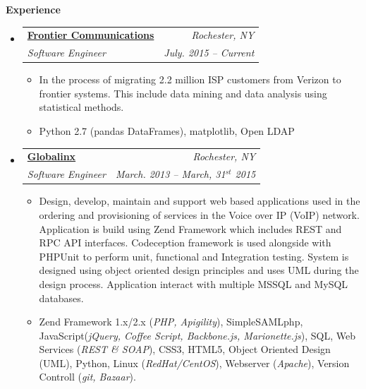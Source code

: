 \documentclass[11pt]{article}
\makeatletter
\newcommand{\resitem}[1]{\item #1 \vspace{-2pt}}
\newcommand{\resheading}[1]{{\large \colorbox{mygrey}{\begin{minipage}{\textwidth}{\textbf{#1 \vphantom{p\^{E}}}}\end{minipage}}}}
\newcommand{\ressubheading}[4]{
\begin{tabular*}{6.5in}{l@{\extracolsep{\fill}}r}
		\textbf{#1} & \textit{#2} \\
		\textit{#3} & \textit{#4} \\
\end{tabular*}\vspace{-6pt}}
\makeatother
\begin{document}
\resheading{Experience}
	\begin{itemize}
		\item 
			\ressubheading{\href{https://frontier.com/}{Frontier Communications}}{Rochester, NY}{Software Engineer}{July. 2015 -- Current}
				{ \footnotesize
				\begin{itemize}
					\resitem{
					In the process of migrating 2.2 million ISP customers from Verizon to frontier systems. This include data mining and data analysis using statistical methods.
					}
					\resitem{
					Python 2.7 (pandas DataFrames), matplotlib, Open LDAP
					}
				\end{itemize}
				}

		\item 
			\ressubheading{\href{https://globalinx.com/}{Globalinx}}{Rochester, NY}{Software Engineer}{March. 2013 -- March, 31$^{st}$ 2015}
				{ \footnotesize
				\begin{itemize}
					\resitem{
					
					Design, develop, maintain and support web based applications used in the ordering and provisioning of services in the Voice over IP (VoIP) network. Application is build using Zend Framework which includes REST and RPC API interfaces. Codeception framework is used alongside with PHPUnit to perform unit, functional and Integration testing. System is designed using object oriented design principles and uses UML during the design process. Application interact with multiple MSSQL and MySQL databases.				
					}
					\resitem {
					Zend Framework 1.x/2.x (\textit{PHP, Apigility}), SimpleSAMLphp, JavaScript(\textit{jQuery, Coffee Script, Backbone.js, Marionette.js}), SQL, Web Services (\textit{REST \& SOAP}), CSS3, HTML5, Object Oriented Design (UML), Python, Linux (\textit{RedHat/CentOS}), Webserver (\textit{Apache}), Version Controll (\textit{git, Bazaar}).
						
}
\end{itemize}}
\end{itemize}
\end{document}
